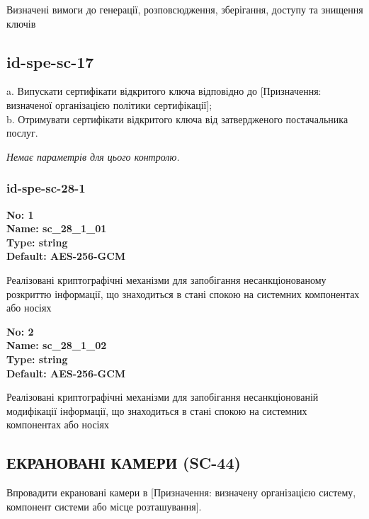 \documentclass{article}
\begin{document}
{\footnotesize Визначені вимоги до генерації, розповсюдження, зберігання, доступу та знищення ключів}




\subsection{id-spe-sc-17}
a. Випускати сертифікати відкритого ключа відповідно до [Призначення: визначеної організацією політики сертифікації];\\ 
b. Отримувати сертифікати відкритого ключа від затвердженого постачальника послуг.

\vspace{10pt}
\textit{Немає параметрів для цього контролю.}
\vspace{10pt}


\subsubsection{id-spe-sc-28-1}


\vspace{10pt}
{\footnotesize\bfseries
No: 1\\
Name: sc\_\allowbreak{}28\_\allowbreak{}1\_\allowbreak{}01\\
Type: string\\
Default: \textquotedbl{}AES-256-GCM\textquotedbl{}
}

{\footnotesize Реалізовані криптографічні механізми для запобігання несанкціонованому розкриттю інформації, що знаходиться в стані спокою на системних компонентах або носіях}


{\footnotesize\bfseries
No: 2\\
Name: sc\_\allowbreak{}28\_\allowbreak{}1\_\allowbreak{}02\\
Type: string\\
Default: \textquotedbl{}AES-256-GCM\textquotedbl{}
}

{\footnotesize Реалізовані криптографічні механізми для запобігання несанкціонованій модифікації інформації, що знаходиться в стані спокою на системних компонентах або носіях}




\subsection{ЕКРАНОВАНІ КАМЕРИ (SC-44)}
Впровадити екрановані камери в [Призначення: визначену організацією систему, компонент системи або місце розташування].
\end{document}
